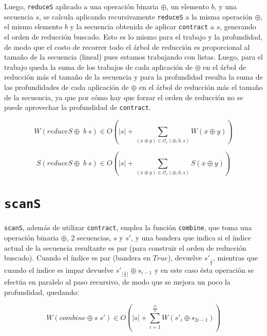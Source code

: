 \documentclass[a4paper,10pt]{article}
\begin{document}
Luego, \texttt{reduceS} aplicado a una operación binaria $\oplus$, un elemento $b$,
y una secuencia $s$, se calcula aplicando recursivamente \texttt{reduceS} a la
misma operación $\oplus$, el mismo elemento $b$ y la secuencia obtenida de aplicar
\texttt{contract} a $s$, generando el orden de reducción buscado. Esto es lo mismo
para el trabajo y la profundidad, de modo que el costo de recorrer todo el árbol
de reducción es proporcional al tamaño de la secuencia (lineal) pues estamos
trabajando con listas. Luego, para el trabajo queda la suma de los trabajos de
cada aplicación de $\oplus$ en el árbol de reducción más el tamaño de la secuencia y
para la profundidad resulta la suma de las profundidades de cada aplicación de
$\oplus$ en el árbol de reducción más el tamaño de la secuencia, ya que por cómo hay
que forzar el orden de reducción no se puede aprovechar la profundidad de \texttt{contract}.

\newpage

\begin{equation*}
    W \left( reduceS \oplus \; b \; s \right) \in
    O \left( \vert s \vert + \sum_{(x \oplus y) \in \mathcal{O}_r(\oplus,b,s)} W \left( x \oplus y \right) \right)
\end{equation*}

\begin{equation*}
    S \left( reduceS \oplus \; b \; s \right) \in
    O \left( \vert s \vert + \sum_{(x \oplus y) \in \mathcal{O}_r(\oplus,b,s)} S \left( x \oplus y \right) \right)
\end{equation*}

\section*{\texttt{scanS}}

\texttt{scanS}, además de utilizar \texttt{contract}, emplea la función \texttt{combine},
que toma una operación binaria $\oplus$, 2 secuencias, $s$ y $s'$, y una bandera
que indica si el índice actual de la secuencia resultante es par (para construir
el orden de reducción buscado). Cuando el índice es par (bandera en $True$),
devuelve $s'_{\frac{i}{2}}$, mientras que cuando el índice es impar devuelve
$s'_{\lfloor \frac{i}{2} \rfloor} \oplus s_{i-1}$ y en este caso ésta operación
se efectúa en paralelo al paso recursivo, de modo que se mejora un poco la
profundidad, quedando:

\begin{equation*}
    W \left( combine \oplus s \; s' \right) \in
    O \left( \vert s \vert + \sum_{i=1}^{\frac{\vert s \vert}{2}} W \left( s'_{i} \oplus s_{2i - 1} \right) \right)
\end{equation*}
\end{document}
